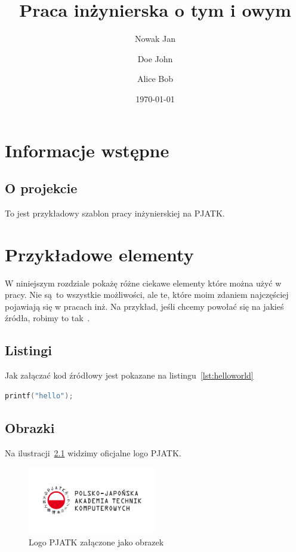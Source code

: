 \documentclass{sprz}
\title{Praca inżynierska o tym i owym}
\author{Nowak Jan}{s1234}{Sztuczna Inteligencja}{Stacjonarny}
\author{Doe John}{s1222}{Aplikacje Internetowe}{Stacjonarny}
\author{Alice Bob}{s1299}{Bumelanctwo stosowane}{Stacjonarny}
\date{\today}
\begin{document}
\maketitle

\makeprojectcard
\makedeclaration

\tableofcontents

\chapter{Informacje wstępne}



\section{O projekcie}\label{ch:wstep}

To jest przykładowy szablon pracy inżynierskiej na PJATK.

\chapter{Przykładowe elementy}

W niniejszym rozdziale pokażę różne ciekawe elementy które można użyć w pracy. Nie są to wszystkie możliwości, ale te, które moim zdaniem najczęściej pojawiają się w pracach inż. Na przykład, jeśli chcemy powołać się na jakieś źródła, robimy to tak~\cite{BEHESHTIROUI2021107419}.

\section{Listingi}

Jak załączać kod źródłowy jest pokazane na listingu~\ref{lst:helloworld}


\begin{lstlisting}[language=c,caption={Przykładowy witaj w świecie}, label={lst:helloworld}]
printf("hello");
\end{lstlisting}

\section{Obrazki}

Na ilustracji~\ref{img:pjatklogo} widzimy oficjalne logo PJATK.

\begin{figure}[h]
    \centering
    \includegraphics[width=0.5\textwidth]{sprz/pjatk}
    \caption{Logo PJATK załączone jako obrazek}
    \label{img:pjatklogo}
\end{figure}
\end{document}
